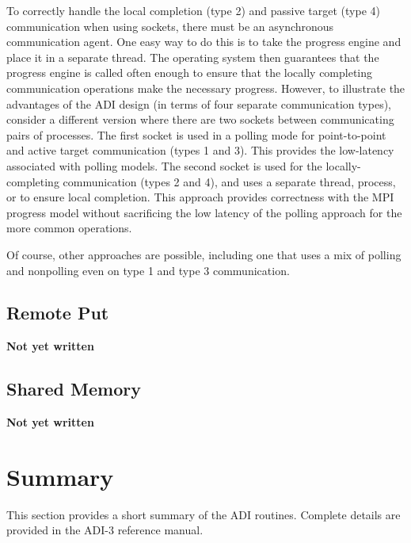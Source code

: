 To correctly handle the local completion (type 2) and passive target
(type 4) communication when using sockets, there must be an
asynchronous communication agent.  One easy way to do this is to take
the progress engine and place it in a separate thread.  The operating
system then guarantees that the progress engine is called often enough
to ensure that the locally completing communication operations make
the necessary progress.  However, to illustrate the advantages of the
ADI design (in terms of four separate communication types), consider a
different version where there are two sockets   
between communicating pairs of processes.  The first socket is used in
a polling mode for point-to-point and active target communication
(types 1 and 3).  This provides the low-latency associated with
polling models.  The second socket is used for the locally-completing
communication (types 2 and 4), and uses a separate thread, process, or
 to ensure local completion.  This approach provides correctness
with the MPI progress model without sacrificing the low latency of the
polling approach for the more common operations.  

Of course, other approaches are possible, including one that uses a
mix of polling and nonpolling even on type 1 and type 3 communication.

\subsection{Remote Put}
\textbf{Not yet written}

\subsection{Shared Memory}
\textbf{Not yet written}




\section{Summary}
\label{sec:adi-summary}
This section provides a short summary of the ADI routines.  Complete details
are provided in the ADI-3 reference manual.

